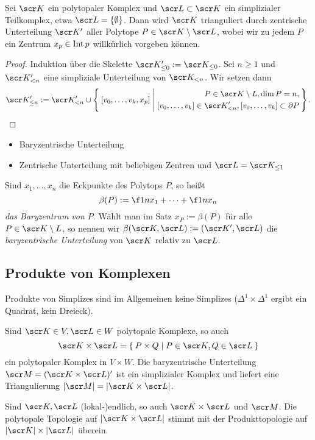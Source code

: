 \begin{st}
	Sei $\scr K$ ein polytopaler Komplex und $\scr L \subset \scr K$ ein simplizialer Teilkomplex, etwa $\scr L = \{\emptyset\}$.
	Dann wird $\scr K$ trianguliert durch zentrische Unterteilung $\scr K'$ aller Polytope $P \in \scr K \setminus \scr L$, wobei wir zu jedem $P$ ein Zentrum $x_p \in \operatorname{Int} p$ willkürlich vorgeben können.
	\begin{proof}
		Induktion über die Skelette $\scr K_{\le 0}' := \scr K_{\le 0}$.
		Sei $n \ge 1$ und $\scr K'_{<n}$ eine simpliziale Unterteilung von $\scr K_{<n}$.
		Wir setzen dann
		\[
			\scr K_{\le n}'
			:= \scr K_{<n}' \cup
			\Set{ [v_0,\dotsc, v_k, x_p] |
				\begin{aligned}
					P \in \scr K \setminus L, \dim P = n, \\
					[v_0, \dotsc, v_k] \in \scr K'_{<n},
					[v_0, \dotsc, v_k] \subset \boundary P
				\end{aligned}}.
		\]
	\end{proof}
\end{st}

\begin{ex}
	\begin{itemize}
		\item
			Baryzentrische Unterteilung
		\item
			Zentrische Unterteilung mit beliebigen Zentren und $\scr L = \scr K_{\le 1}$
	\end{itemize}
\end{ex}

\begin{df}
	Sind $x_1, \dotsc, x_n$ die Eckpunkte des Polytops $P$, so heißt
	\[
		\beta(P) := \f 1n x_1 + \dotsb + \f 1n x_n
	\]
	\emph{das Baryzentrum von $P$}.
	Wählt man im Satz %
	$x_P := \beta(P)$ für alle $P \in \scr K \setminus L$, so nennen wir $\beta(\scr K, \scr L) := (\scr K', \scr L)$ die \emph{baryzentrische Unterteilung} von $\scr K$ relativ zu $\scr L$.
\end{df}

\subsection{Produkte von Komplexen}

Produkte von Simplizes sind im Allgemeinen keine Simplizes ($\Delta^1 \times \Delta^1$ ergibt ein Quadrat, kein Dreieck).

\begin{st}
	Sind $\scr K \in V, \scr L \in W$ polytopale Komplexe, so auch
	\[
		\scr K \times \scr L = \Set{ P \times Q | P \in \scr K, Q \in \scr L }
	\]
	ein polytopaler Komplex in $V \times W$.
	Die baryzentrische Unterteilung $\scr M = (\scr K \times \scr L)'$ ist ein simplizialer Komplex und liefert eine Triangulierung $| \scr M| = | \scr K \times \scr L|$.

	Sind $\scr K, \scr L$ (lokal-)endlich, so auch $\scr K \times \scr L$ und $\scr M$.
	Die polytopale Topologie auf $|\scr K \times \scr L|$ stimmt mit der Produkttopologie auf $|\scr K| \times |\scr L|$ überein.
\end{st}

